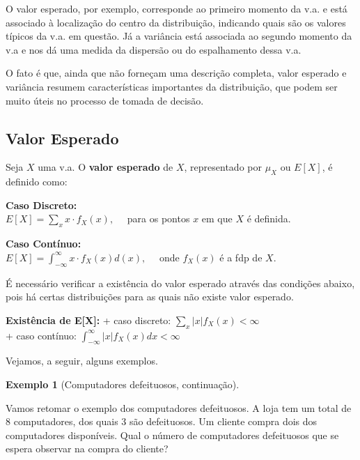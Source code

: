 \documentclass[
]{book}
\theoremstyle{definition}
\theoremstyle{definition}
\newtheorem{example}{Exemplo}[chapter]
\theoremstyle{definition}
\theoremstyle{remark}
\begin{document}
O valor esperado, por exemplo, corresponde ao primeiro momento da v.a. e está associado à localização do centro da distribuição, indicando quais são os valores típicos da v.a. em questão.
Já a variância está associada ao segundo momento da v.a e nos dá uma medida da dispersão ou do espalhamento dessa v.a.

O fato é que, ainda que não forneçam uma descrição completa, valor esperado e variância resumem características importantes da distribuição, que podem ser muito úteis no processo de tomada de decisão.

\hypertarget{valor-esperado}{%
\subsection*{Valor Esperado}\label{valor-esperado}}

Seja \(X\) uma v.a. O \textbf{valor esperado} de \(X\), representado por \({\mu_X}\) ou \({E[X]}\), é definido como:

\textbf{Caso Discreto:}\\
\({E[X] = \sum_x x\cdot f_X(x)}, \quad\) para os pontos \({x}\) em que \({X}\) é definida.

\textbf{Caso Contínuo:}\\
\({E[X] = \int_{-\infty}^\infty x\cdot f_X(x) d(x)}, \quad\) onde \({f_X(x)}\) é a fdp de \({X}\).

É necessário verificar a existência do valor esperado através das condições abaixo, pois há certas distribuições para as quais não existe valor esperado.

\textbf{Existência de E{[}X{]}:}
+ caso discreto: \({\sum_x |x|f_X(x) < \infty}\)\\
+ caso contínuo: \({\int_{-\infty}^{\infty} |x|f_X(x)dx < \infty}\)

Vejamos, a seguir, alguns exemplos.

\begin{example}[Computadores defeituosos, continuação]
\protect\hypertarget{exm:unnamed-chunk-15}{}{\label{exm:unnamed-chunk-15} {} }
\end{example}

Vamos retomar o exemplo dos computadores defeituosos. A loja tem um total de 8 computadores, dos quais 3 são defeituosos. Um cliente compra dois dos computadores disponíveis. Qual o número de computadores defeituosos que se espera observar na compra do cliente?
\end{document}

